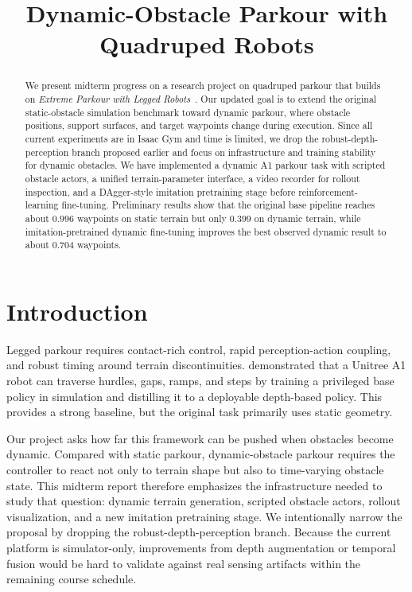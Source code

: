 \documentclass[conference]{IEEEtran}
\begin{document}
\title{Dynamic-Obstacle Parkour with Quadruped Robots}

\author{
   \and
}

\maketitle

\begin{abstract}
   We present midterm progress on a research project on quadruped parkour that builds on \emph{Extreme Parkour with Legged Robots}~\citep{cheng2023parkour}. Our updated goal is to extend the original static-obstacle simulation benchmark toward dynamic parkour, where obstacle positions, support surfaces, and target waypoints change during execution. Since all current experiments are in Isaac Gym and time is limited, we drop the robust-depth-perception branch proposed earlier and focus on infrastructure and training stability for dynamic obstacles. We have implemented a dynamic A1 parkour task with scripted obstacle actors, a unified terrain-parameter interface, a video recorder for rollout inspection, and a DAgger-style imitation pretraining stage before reinforcement-learning fine-tuning. Preliminary results show that the original base pipeline reaches about $0.996$ waypoints on static terrain but only $0.399$ on dynamic terrain, while imitation-pretrained dynamic fine-tuning improves the best observed dynamic result to about $0.704$ waypoints.
\end{abstract}

\IEEEpeerreviewmaketitle

\section{Introduction}
Legged parkour requires contact-rich control, rapid perception-action coupling, and robust timing around terrain discontinuities. \citet{cheng2023parkour} demonstrated that a Unitree A1 robot can traverse hurdles, gaps, ramps, and steps by training a privileged base policy in simulation and distilling it to a deployable depth-based policy. This provides a strong baseline, but the original task primarily uses static geometry.

Our project asks how far this framework can be pushed when obstacles become dynamic. Compared with static parkour, dynamic-obstacle parkour requires the controller to react not only to terrain shape but also to time-varying obstacle state. This midterm report therefore emphasizes the infrastructure needed to study that question: dynamic terrain generation, scripted obstacle actors, rollout visualization, and a new imitation pretraining stage. We intentionally narrow the proposal by dropping the robust-depth-perception branch. Because the current platform is simulator-only, improvements from depth augmentation or temporal fusion would be hard to validate against real sensing artifacts within the remaining course schedule.
\end{document}
